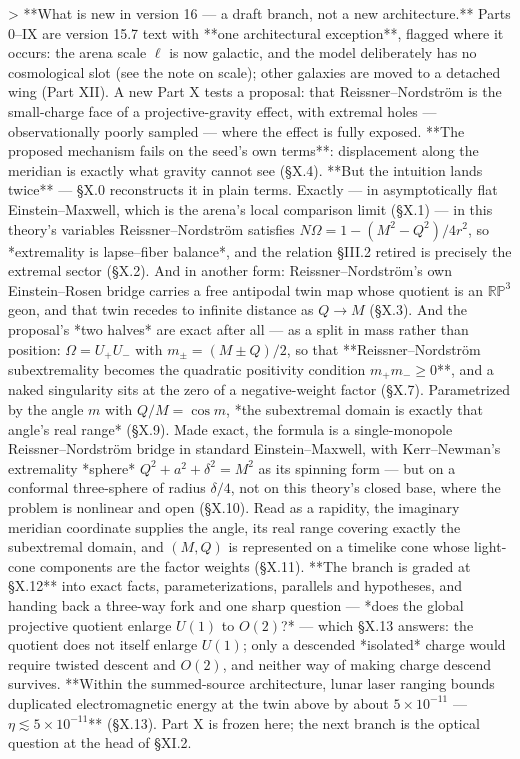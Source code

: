 > **What is new in version 16 — a draft branch, not a new architecture.** Parts 0–IX are version 15.7 text with **one architectural exception**, flagged where it occurs: the arena scale $\ell$ is now galactic, and the model deliberately has no cosmological slot (see the note on scale); other galaxies are moved to a detached wing (Part XII). A new Part X tests a proposal: that Reissner–Nordström is the small-charge face of a projective-gravity effect, with extremal holes — observationally poorly sampled — where the effect is fully exposed. **The proposed mechanism fails on the seed's own terms**: displacement along the meridian is exactly what gravity cannot see (§X.4). **But the intuition lands twice** — §X.0 reconstructs it in plain terms. Exactly — in asymptotically flat Einstein–Maxwell, which is the arena's local comparison limit (§X.1) — in this theory's variables Reissner–Nordström satisfies $N\Omega = 1-(M^2-Q^2)/4r^2$, so *extremality is lapse–fiber balance*, and the relation §III.2 retired is precisely the extremal sector (§X.2). And in another form: Reissner–Nordström's own Einstein–Rosen bridge carries a free antipodal twin map whose quotient is an $\mathbb{RP}^3$ geon, and that twin recedes to infinite distance as $Q\to M$ (§X.3). And the proposal's *two halves* are exact after all — as a split in mass rather than position: $\Omega = U_+U_-$ with $m_\pm = (M\pm Q)/2$, so that **Reissner–Nordström subextremality becomes the quadratic positivity condition $m_+m_-\geq0$**, and a naked singularity sits at the zero of a negative-weight factor (§X.7). Parametrized by the angle $m$ with $Q/M = \cos m$, *the subextremal domain is exactly that angle's real range* (§X.9). Made exact, the formula is a single-monopole Reissner–Nordström bridge in standard Einstein–Maxwell, with Kerr–Newman's extremality *sphere* $Q^2+a^2+\delta^2 = M^2$ as its spinning form — but on a conformal three-sphere of radius $\delta/4$, not on this theory's closed base, where the problem is nonlinear and open (§X.10). Read as a rapidity, the imaginary meridian coordinate supplies the angle, its real range covering exactly the subextremal domain, and $(M,Q)$ is represented on a timelike cone whose light-cone components are the factor weights (§X.11). **The branch is graded at §X.12** into exact facts, parameterizations, parallels and hypotheses, and handing back a three-way fork and one sharp question — *does the global projective quotient enlarge $U(1)$ to $O(2)$?* — which §X.13 answers: the quotient does not itself enlarge $U(1)$; only a descended *isolated* charge would require twisted descent and $O(2)$, and neither way of making charge descend survives. **Within the summed-source architecture, lunar laser ranging bounds duplicated electromagnetic energy at the twin above by about $5\times10^{-11}$ — $\eta\lesssim5\times10^{-11}$** (§X.13). Part X is frozen here; the next branch is the optical question at the head of §XI.2.
